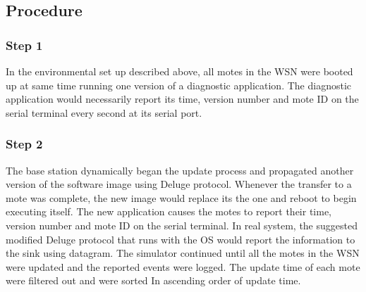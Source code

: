 \documentclass[conference,manuscript]{IEEEtran}
\newcommand{\notedme}[1]{\raisebox{0pt}[0pt][0pt]{\pdfcomment[open=true,color=blue]{#1}}}
\begin{document}
\subsection*{Procedure}
\label{subsec:proc}
%
%
%
\subsubsection*{Step 1} 
In the environmental set up described above, all motes in the WSN were booted up at same time running one version of a diagnostic application. 
The diagnostic application would necessarily report its time, version number and mote ID on the serial terminal every second at its serial port. 


\subsubsection*{Step 2} 
The base station dynamically began the update process and propagated another version of the software image using Deluge protocol. %
Whenever the transfer to a mote was complete, the new image would replace its the one and reboot to begin executing itself.
The  new application causes the motes to report their time, version number and mote ID on the serial terminal. 
In real system, the suggested modified Deluge protocol that runs with the OS would report the information to the sink using datagram.
The simulator continued until all the motes in the WSN were updated and the reported events were logged. 
The update time of each mote were filtered out  and were sorted In ascending order of update time.

\end{document}
